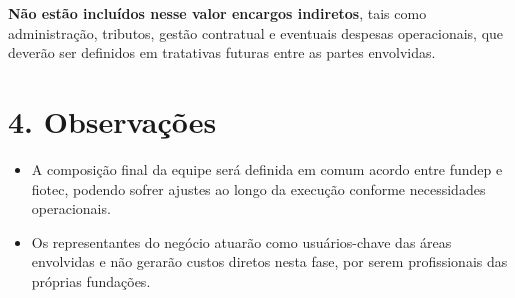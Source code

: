 \documentclass[12pt,a4paper]{report}
\begin{document}
    \textbf{Não estão incluídos nesse valor encargos indiretos}, tais como administração, tributos, gestão contratual e eventuais despesas operacionais, que deverão ser definidos em tratativas futuras entre as partes envolvidas.

    \section*{4. Observações}

    \begin{itemize}
        \item A composição final da equipe será definida em comum acordo entre \gls{fundep} e \gls{fiotec}, podendo sofrer ajustes ao longo da execução conforme necessidades operacionais.
        \item Os representantes do negócio atuarão como usuários-chave das áreas envolvidas e não gerarão custos diretos nesta fase, por serem profissionais das próprias fundações.
    \end{itemize}
\end{document}
